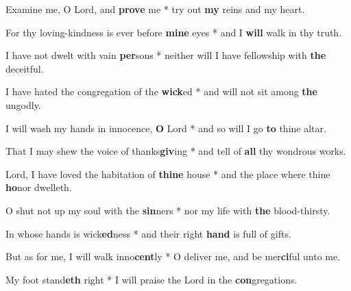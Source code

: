 \begin{multicols}{2}
	Examine me, O Lord, and \textbf{prove} me * try out \textbf{my} reins and my heart.
	
	For thy loving-kindness is ever before \textbf{mine} eyes * and I \textbf{will} walk in thy truth.
	
	I have not dwelt with vain \textbf{per}sons * neither will I have fellowship with \textbf{the} deceitful.
	
	I have hated the congregation of the \textbf{wick}ed * and will not sit among \textbf{the} ungodly.
	
	I will wash my hands in innocence, \textbf{O} Lord * and so will I go \textbf{to} thine altar.
	
	That I may shew the voice of thanks\textbf{giv}ing * and tell of \textbf{all} thy wondrous works.
	
	Lord, I have loved the habitation of \textbf{thine} house * and the place where thine \textbf{ho}nor dwelleth.
	
	O shut not up my soul with the \textbf{sin}ners * nor my life with \textbf{the} blood-thirsty.
	
	In whose hands is wick\textbf{ed}ness * and their right \textbf{hand} is full of gifts.
	
	But as for me, I will walk inno\textbf{cent}ly * O deliver me, and be mer\textbf{ci}ful unto me.
	
	My foot stand\textbf{eth} right * I will praise the Lord in the \textbf{con}gregations.
\end{multicols}